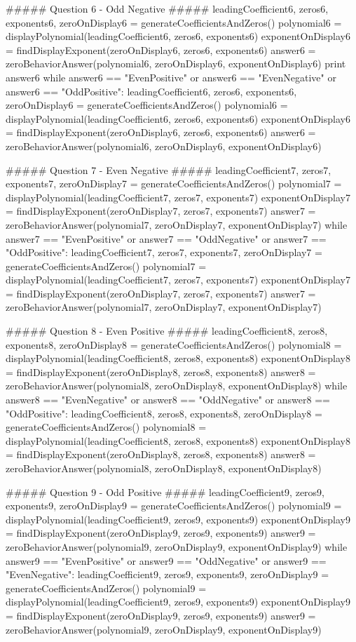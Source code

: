 \documentclass{ximera}
\begin{document}
\begin{sagesilent}
##### Question 6 - Odd Negative #####
leadingCoefficient6, zeros6, exponents6, zeroOnDisplay6 = generateCoefficientsAndZeros()
polynomial6 = displayPolynomial(leadingCoefficient6, zeros6, exponents6)
exponentOnDisplay6 = findDisplayExponent(zeroOnDisplay6, zeros6, exponents6)
answer6 = zeroBehaviorAnswer(polynomial6, zeroOnDisplay6, exponentOnDisplay6)
print answer6
while answer6 == "EvenPositive" or answer6 == "EvenNegative" or answer6 == "OddPositive":
    leadingCoefficient6, zeros6, exponents6, zeroOnDisplay6 = generateCoefficientsAndZeros()
    polynomial6 = displayPolynomial(leadingCoefficient6, zeros6, exponents6)
    exponentOnDisplay6 = findDisplayExponent(zeroOnDisplay6, zeros6, exponents6)
    answer6 =  zeroBehaviorAnswer(polynomial6, zeroOnDisplay6, exponentOnDisplay6)

##### Question 7 - Even Negative #####
leadingCoefficient7, zeros7, exponents7, zeroOnDisplay7 = generateCoefficientsAndZeros()
polynomial7 = displayPolynomial(leadingCoefficient7, zeros7, exponents7)
exponentOnDisplay7 = findDisplayExponent(zeroOnDisplay7, zeros7, exponents7)
answer7 = zeroBehaviorAnswer(polynomial7, zeroOnDisplay7, exponentOnDisplay7)
while answer7 == "EvenPositive" or answer7 == "OddNegative" or answer7 == "OddPositive":
    leadingCoefficient7, zeros7, exponents7, zeroOnDisplay7 = generateCoefficientsAndZeros()
    polynomial7 = displayPolynomial(leadingCoefficient7, zeros7, exponents7)
    exponentOnDisplay7 = findDisplayExponent(zeroOnDisplay7, zeros7, exponents7)
    answer7 =  zeroBehaviorAnswer(polynomial7, zeroOnDisplay7, exponentOnDisplay7)

##### Question 8 - Even Positive #####
leadingCoefficient8, zeros8, exponents8, zeroOnDisplay8 = generateCoefficientsAndZeros()
polynomial8 = displayPolynomial(leadingCoefficient8, zeros8, exponents8)
exponentOnDisplay8 = findDisplayExponent(zeroOnDisplay8, zeros8, exponents8)
answer8 = zeroBehaviorAnswer(polynomial8, zeroOnDisplay8, exponentOnDisplay8)
while answer8 == "EvenNegative" or answer8 == "OddNegative" or answer8 == "OddPositive":
    leadingCoefficient8, zeros8, exponents8, zeroOnDisplay8 = generateCoefficientsAndZeros()
    polynomial8 = displayPolynomial(leadingCoefficient8, zeros8, exponents8)
    exponentOnDisplay8 = findDisplayExponent(zeroOnDisplay8, zeros8, exponents8)
    answer8 =  zeroBehaviorAnswer(polynomial8, zeroOnDisplay8, exponentOnDisplay8)

##### Question 9 - Odd Positive #####
leadingCoefficient9, zeros9, exponents9, zeroOnDisplay9 = generateCoefficientsAndZeros()
polynomial9 = displayPolynomial(leadingCoefficient9, zeros9, exponents9)
exponentOnDisplay9 = findDisplayExponent(zeroOnDisplay9, zeros9, exponents9)
answer9 = zeroBehaviorAnswer(polynomial9, zeroOnDisplay9, exponentOnDisplay9)
while answer9 == "EvenPositive" or answer9 == "OddNegative" or answer9 == "EvenNegative":
    leadingCoefficient9, zeros9, exponents9, zeroOnDisplay9 = generateCoefficientsAndZeros()
    polynomial9 = displayPolynomial(leadingCoefficient9, zeros9, exponents9)
    exponentOnDisplay9 = findDisplayExponent(zeroOnDisplay9, zeros9, exponents9)
    answer9 =  zeroBehaviorAnswer(polynomial9, zeroOnDisplay9, exponentOnDisplay9)
\end{sagesilent}
\end{document}
